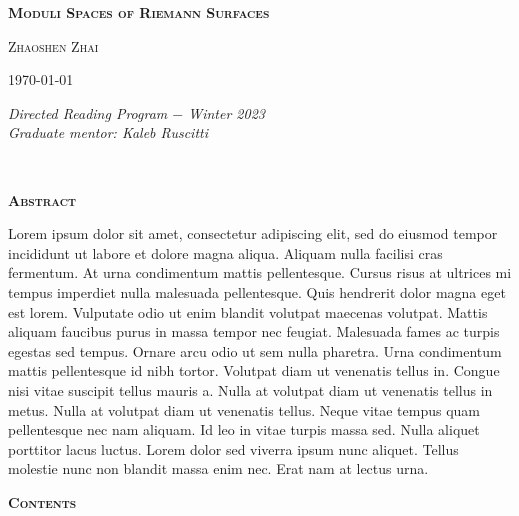 \pagestyle{empty}
\begin{center}
    \Large\textbf{\textsc{Moduli Spaces of Riemann Surfaces}}
    \\[1.2\baselineskip]
    \begin{center}
        \large{\textsc{Zhaoshen Zhai}}
    \end{center}
    \normalsize\today
\end{center}
\vspace*{0.01\textheight}
\begin{minipage}{0.5\textwidth}
    \hspace{0.2in}\textit{Directed Reading Program $-$ Winter 2023}
    \\[0.3\baselineskip]
    \hspace*{0.19in}\textit{Graduate mentor: Kaleb Ruscitti}
\end{minipage}
\\[\baselineskip]
\begin{center}
    \textsc{\bfseries Abstract}
    \\[1.5\baselineskip]
    \begin{minipage}{0.8\textwidth}
        Lorem ipsum dolor sit amet, consectetur adipiscing elit, sed do eiusmod tempor incididunt ut labore et dolore magna aliqua. Aliquam nulla facilisi cras fermentum. At urna condimentum mattis pellentesque. Cursus risus at ultrices mi tempus imperdiet nulla malesuada pellentesque. Quis hendrerit dolor magna eget est lorem. Vulputate odio ut enim blandit volutpat maecenas volutpat. Mattis aliquam faucibus purus in massa tempor nec feugiat. Malesuada fames ac turpis egestas sed tempus. Ornare arcu odio ut sem nulla pharetra. Urna condimentum mattis pellentesque id nibh tortor. Volutpat diam ut venenatis tellus in. Congue nisi vitae suscipit tellus mauris a. Nulla at volutpat diam ut venenatis tellus in metus. Nulla at volutpat diam ut venenatis tellus. Neque vitae tempus quam pellentesque nec nam aliquam. Id leo in vitae turpis massa sed. Nulla aliquet porttitor lacus luctus. Lorem dolor sed viverra ipsum nunc aliquet. Tellus molestie nunc non blandit massa enim nec. Erat nam at lectus urna.
    \end{minipage}
\end{center}
\vspace*{0.02\textheight}
\begin{center}
    \textsc{\bfseries Contents}
\end{center}

\toccontents
\clearpage
\pagestyle{fancyplain}
\fancyhead[L,C,R]{}
\fancyfoot[L,R]{}
\fancyfoot[C]{\thepage}
\renewcommand{\headrulewidth}{0pt}
\setcounter{page}{1}
